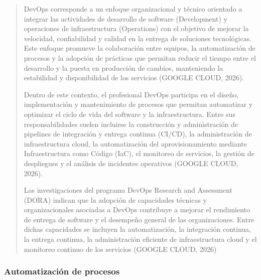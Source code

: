 \documentclass[
]{article}
\begin{document}
\begin{quote}
DevOps corresponde a un enfoque organizacional y técnico orientado a
integrar las actividades de desarrollo de software (Development) y
operaciones de infraestructura (Operations) con el objetivo de mejorar
la velocidad, confiabilidad y calidad en la entrega de soluciones
tecnológicas. Este enfoque promueve la colaboración entre equipos, la
automatización de procesos y la adopción de prácticas que permitan
reducir el tiempo entre el desarrollo y la puesta en producción de
cambios, manteniendo la estabilidad y disponibilidad de los servicios
(GOOGLE CLOUD, 2026).

Dentro de este contexto, el profesional DevOps participa en el diseño,
implementación y mantenimiento de procesos que permitan automatizar y
optimizar el ciclo de vida del software y la infraestructura. Entre sus
responsabilidades suelen incluirse la construcción y administración de
pipelines de integración y entrega continua (CI/CD), la administración
de infraestructura cloud, la automatización del aprovisionamiento
mediante Infraestructura como Código (IaC), el monitoreo de servicios,
la gestión de despliegues y el análisis de incidentes operativos (GOOGLE
CLOUD, 2026).

Las investigaciones del programa DevOps Research and Assessment (DORA)
indican que la adopción de capacidades técnicas y organizacionales
asociadas a DevOps contribuye a mejorar el rendimiento de entrega de
software y el desempeño general de las organizaciones. Entre dichas
capacidades se incluyen la automatización, la integración continua, la
entrega continua, la administración eficiente de infraestructura cloud y
el monitoreo continuo de los servicios (GOOGLE CLOUD, 2026)
\end{quote}

\subsubsection{Automatización de
procesos}\label{automatizaciuxf3n-de-procesos}
\end{document}
